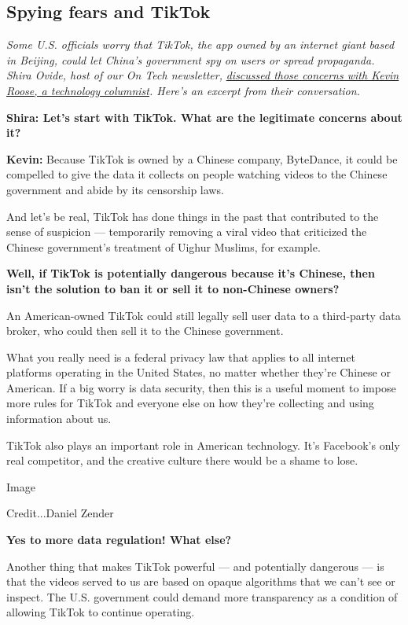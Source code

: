 \hypertarget{spying-fears-and-tiktok}{%
\subsection{Spying fears and TikTok}\label{spying-fears-and-tiktok}}

\emph{Some U.S. officials worry that TikTok, the app owned by an
internet giant based in Beijing, could let China's government spy on
users or spread propaganda. Shira Ovide, host of our On Tech
newsletter,}
\href{https://www.nytimes.com/2020/07/27/technology/tiktok-data-privacy.html}{\emph{discussed
those concerns with Kevin Roose, a technology columnist}}\emph{. Here's
an excerpt from their conversation.}

\textbf{Shira: Let's start with TikTok. What are the legitimate concerns
about it?}

\textbf{Kevin:} Because TikTok is owned by a Chinese company, ByteDance,
it could be compelled to give the data it collects on people watching
videos to the Chinese government and abide by its censorship laws.

And let's be real, TikTok has done things in the past that contributed
to the sense of suspicion --- temporarily removing a viral video that
criticized the Chinese government's treatment of Uighur Muslims, for
example.

\textbf{Well, if TikTok is potentially dangerous because it's Chinese,
then isn't the solution to ban it or sell it to non-Chinese owners?}

An American-owned TikTok could still legally sell user data to a
third-party data broker, who could then sell it to the Chinese
government.

What you really need is a federal privacy law that applies to all
internet platforms operating in the United States, no matter whether
they're Chinese or American. If a big worry is data security, then this
is a useful moment to impose more rules for TikTok and everyone else on
how they're collecting and using information about us.

TikTok also plays an important role in American technology. It's
Facebook's only real competitor, and the creative culture there would be
a shame to lose.

Image

Credit...Daniel Zender

\textbf{Yes to more data regulation! What else?}

Another thing that makes TikTok powerful --- and potentially dangerous
--- is that the videos served to us are based on opaque algorithms that
we can't see or inspect. The U.S. government could demand more
transparency as a condition of allowing TikTok to continue operating.

